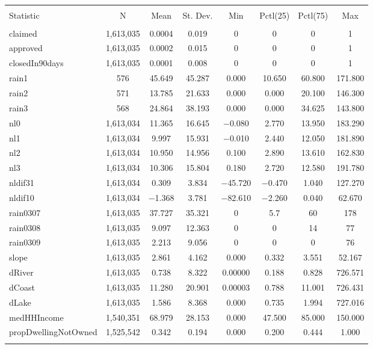 \documentclass{article}
\begin{document}
\begin{table}[!htbp] \centering 
\caption{} 
\label{} 
\begin{tabular}{@{\extracolsep{5pt}}lccccccc} 
\\[-1.8ex]\hline 
\hline \\[-1.8ex] 
Statistic & \multicolumn{1}{c}{N} & \multicolumn{1}{c}{Mean} & \multicolumn{1}{c}{St. Dev.} & \multicolumn{1}{c}{Min} & \multicolumn{1}{c}{Pctl(25)} & \multicolumn{1}{c}{Pctl(75)} & \multicolumn{1}{c}{Max} \\ 
\hline \\[-1.8ex] 
claimed & 1,613,035 & 0.0004 & 0.019 & 0 & 0 & 0 & 1 \\ 
approved & 1,613,035 & 0.0002 & 0.015 & 0 & 0 & 0 & 1 \\ 
closedIn90days & 1,613,035 & 0.0001 & 0.008 & 0 & 0 & 0 & 1 \\ 
rain1 & 576 & 45.649 & 45.287 & 0.000 & 10.650 & 60.800 & 171.800 \\ 
rain2 & 571 & 13.785 & 21.633 & 0.000 & 0.000 & 20.100 & 146.300 \\ 
rain3 & 568 & 24.864 & 38.193 & 0.000 & 0.000 & 34.625 & 143.800 \\ 
nl0 & 1,613,034 & 11.365 & 16.645 & $-$0.080 & 2.770 & 13.950 & 183.290 \\ 
nl1 & 1,613,034 & 9.997 & 15.931 & $-$0.010 & 2.440 & 12.050 & 181.890 \\ 
nl2 & 1,613,034 & 10.950 & 14.956 & 0.100 & 2.890 & 13.610 & 162.830 \\ 
nl3 & 1,613,034 & 10.306 & 15.804 & 0.180 & 2.720 & 12.580 & 191.780 \\ 
nldif31 & 1,613,034 & 0.309 & 3.834 & $-$45.720 & $-$0.470 & 1.040 & 127.270 \\ 
nldif10 & 1,613,034 & $-$1.368 & 3.781 & $-$82.610 & $-$2.260 & 0.040 & 62.670 \\ 
rain0307 & 1,613,035 & 37.727 & 35.321 & 0 & 5.7 & 60 & 178 \\ 
rain0308 & 1,613,035 & 9.097 & 12.363 & 0 & 0 & 14 & 77 \\ 
rain0309 & 1,613,035 & 2.213 & 9.056 & 0 & 0 & 0 & 76 \\ 
slope & 1,613,035 & 2.861 & 4.162 & 0.000 & 0.332 & 3.551 & 52.167 \\ 
dRiver & 1,613,035 & 0.738 & 8.322 & 0.00000 & 0.188 & 0.828 & 726.571 \\ 
dCoast & 1,613,035 & 11.280 & 20.901 & 0.00003 & 0.788 & 11.001 & 726.431 \\ 
dLake & 1,613,035 & 1.586 & 8.368 & 0.000 & 0.735 & 1.994 & 727.016 \\ 
medHHIncome & 1,540,351 & 68.979 & 28.153 & 0.000 & 47.500 & 85.000 & 150.000 \\ 
propDwellingNotOwned & 1,525,542 & 0.342 & 0.194 & 0.000 & 0.200 & 0.444 & 1.000 \\ 
\hline \\[-1.8ex] 
\end{tabular} 
\end{table} 
\end{document}
